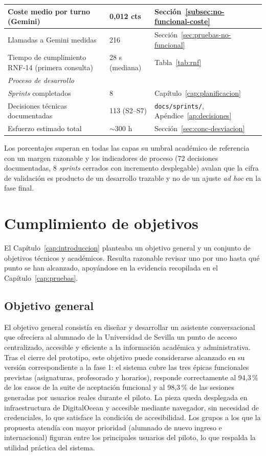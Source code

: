 \begin{table}[hbtp]
\begin{tabular}{|p{5.4cm}|p{2.0cm}|p{4.6cm}|}
Coste medio por turno (Gemini) & 0,012 cts & Sección~\ref{subsec:no-funcional-coste} \\ \hline
Llamadas a Gemini medidas & 216 & Sección~\ref{sec:pruebas-no-funcional} \\ \hline
Tiempo de cumplimiento RNF-14 (primera consulta) & 28 s (mediana) & Tabla~\ref{tab:rnf} \\ \hline
\multicolumn{3}{|l|}{\textit{Proceso de desarrollo}} \\ \hline
\textit{Sprints} completados & 8 & Capítulo~\ref{cap:planificacion} \\ \hline
Decisiones técnicas documentadas & 113 (S2--S7) & \texttt{docs/sprints/}, Apéndice~\ref{ap:decisiones} \\ \hline
Esfuerzo estimado total & $\sim$300 h & Sección~\ref{sec:conc-desviacion} \\ \hline
\end{tabular}
\end{table}

Los porcentajes superan en todas las capas su umbral académico de referencia con un margen razonable y los indicadores de proceso (72 decisiones documentadas, 8 \textit{sprints} cerrados con incremento desplegable) avalan que la cifra de validación es producto de un desarrollo trazable y no de un ajuste \textit{ad hoc} en la fase final.

\section{Cumplimiento de objetivos}\label{sec:conc-objetivos}

El Capítulo~\ref{cap:introduccion} planteaba un objetivo general y un conjunto de objetivos técnicos y académicos. Resulta razonable revisar uno por uno hasta qué punto se han alcanzado, apoyándose en la evidencia recopilada en el Capítulo~\ref{cap:pruebas}.

\subsection{Objetivo general}\label{subsec:conc-obj-general}

El objetivo general consistía en diseñar y desarrollar un asistente conversacional que ofreciera al alumnado de la Universidad de Sevilla un punto de acceso centralizado, accesible y eficiente a la información académica y administrativa. Tras el cierre del prototipo, este objetivo puede considerarse alcanzado en su versión correspondiente a la fase 1: el sistema cubre las tres épicas funcionales previstas (asignaturas, profesorado y horarios), responde correctamente al 94,3\,\% de los casos de la suite de aceptación funcional y al 98,3\,\% de las sesiones generadas por usuarios reales durante el piloto. La pieza queda desplegada en infraestructura de DigitalOcean y accesible mediante navegador, sin necesidad de credenciales, lo que satisface la condición de accesibilidad. Los grupos a los que la propuesta atendía con mayor prioridad (alumnado de nuevo ingreso e internacional) figuran entre los principales usuarios del piloto, lo que respalda la utilidad práctica del sistema.

